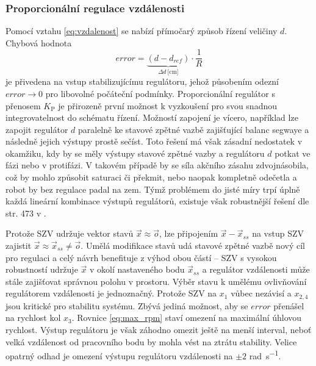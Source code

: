 \documentclass[conference]{IEEEtran}
\begin{document}
\subsubsection{Proporcionální regulace vzdálenosti}

Pomocí vztahu \eqref{eq:vzdalenost} se nabízí přímočarý
způsob řízení veličiny $d$. Chybová hodnota 
\begin{equation}
    error = \underbrace{(d - d_{ref})}_{\Delta d~\text{[cm]}} \cdot \frac{1}{R}
\end{equation}
je přivedena na vstup stabilizujícímu regulátoru, jehož působením odezní $error \to 0$ pro libovolné počáteční podmínky.
Proporcionální regulátor s přenosem $K_{\text{P}}$ je přirozeně první možnost k vyzkoušení pro svou snadnou integrovatelnost do schématu řízení.
Možností zapojení je vícero, například lze zapojit regulátor $d$ paralelně ke stavové zpětné vazbě zajišťující balanc segwaye a následně jejich výstupy prostě sečíst.
Toto řešení má však zásadní nedostatek v okamžiku, kdy by se měly výstupy stavové zpětné vazby a regulátoru $d$ potkat ve fázi nebo v protifázi. V takovém případě by 
se síla akčního zásahu zdvojnásobila, což by mohlo způsobit saturaci či překmit, nebo naopak kompletně odečetla a robot by bez regulace padal na zem. Týmž problémem
do jisté míry trpí úplně každá lineární kombinace výstupů regulátorů, existuje však robustnější řešení dle str. 473 v \cite{franklin}.

Protože SZV udržuje vektor stavů $\vec{x} \approx \vec{o}$, lze připojením $\vec{x} - \vec{x}_{ss}$ na vstup SZV zajistit $\vec{x} \approx \vec{x}_{ss} \neq \vec{o}$.
Umělá modifikace stavů udá stavové zpětné vazbě nový cíl pro regulaci a celý návrh benefituje z výhod obou částí -- SZV s vysokou robustností udržuje $\vec{x}$ v okolí
nastaveného bodu $\vec{x}_{ss}$ a regulátor vzdálenosti může stále zajišťovat správnou polohu v prostoru. Výběr stavu k umělému ovlivňování regulátorem vzdálenosti je jednoznačný.
Protože SZV na $x_1$ vůbec nezávisí a $x_{2,4}$ jsou kritické pro stabilitu systému. Zbývá jediná možnost, aby se $error$ přenášel na rychlost kol $x_3$.
Rovnice \eqref{eq:max_rpm} staví omezení na maximální úhlovou rychlost. Výstup regulátoru je však záhodno omezit ještě na menší interval, neboť velká vzdálenost od pracovního bodu
by mohla vést na ztrátu stability. Velice opatrný odhad je omezení výstupu regulátoru vzdálenosti na $\pm 2$ \si{\radian\per\second}.
\end{document}
